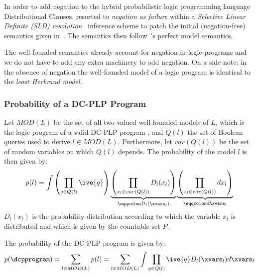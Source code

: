 In order to add negation to the hybrid probabilistic logic programming language Distributional Clauses, \citet{nitti2016probabilistic} resorted to {\em negation as failure} within a {\em Selective Linear Definite (SLD) resolution}~\citep{sterling1994art} inference scheme to patch the initial (negation-free) semantics given in~\citep{gutmann2011magic}. The semantics then follow~\citep{przymusinski1988perfect}'s perfect model semantics.

The well-founded semantics already account for negation in logic programs and we do not have to add any extra machinery to add negation. On a side note: in the absence of negation the well-founded model of a logic program is identical to the {\em least Herbrand model}. 




\subsubsection{Probability of a DC-PLP Program}

\begin{definition}
	Let $MOD(L)$ be the set of all two-valued well-founded models of $L$, which is the logic program of a valid DC-PLP program \dcpprogram, and $Q(l)$ the set of Boolean queries used to derive $l \in MOD(L)$. Furthermore, let $var(Q(l))$ be the set of random variables on which $Q(l)$ depends.
	The probability of the model $l$ is then given by:
	\begin{align}
		p(l) = \int \left( \prod_{q \in Q(l)} \ive{q} \right) \underbrace{\left( \prod_{x_l \in var(Q(l))} D_l(x_l)  \right)}_{\eqqcolon D_l(\xvars_l)} \underbrace{\left( \prod_{x_l \in var(Q(l))} d x_l  \right)}_{\eqqcolon d\xvars_l}
	\end{align}
	$D_l(x_l)$ is the probability distribution according to which the variable $x_l$ is distributed and which is given by the countable set $P$.
	
	The probability of the DC-PLP program \dcpprogram is given by:
	\begin{align}
		p(\dcpprogram) = \sum_{l \in MOD(L)} p(l) = \sum_{l \in MOD(L)} \int \prod_{q \in Q(l)} \ive{q} D_l(\xvars_l) d\xvars_l \label{eq:definition_probability_dcplp}
	\end{align}
\end{definition}



